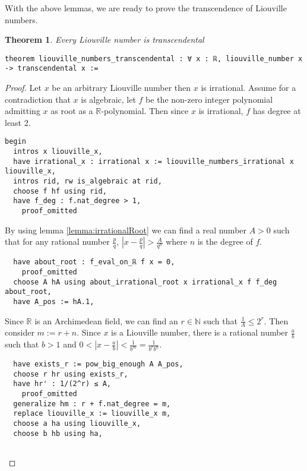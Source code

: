\documentclass{report}
\theoremstyle{definition}
\theoremstyle{plain}
\newtheorem{theorem}{Theorem}[section]
\begin{document}
With the above lemmas, we are ready to prove the transcendence of Liouville numbers.
\begin{theorem}
Every Liouville number is transcendental
\begin{verbatim}
theorem liouville_numbers_transcendental : ∀ x : ℝ, liouville_number x -> transcendental x := 
\end{verbatim}
\end{theorem}

\begin{proof}
Let $x$ be an arbitrary Liouville number then $x$ is irrational. Assume for a contradiction that $x$ is algebraic, let $f$ be the non-zero integer polynomial admitting $x$ as root as a $\mathbb R$-polynomial. Then since $x$ is irrational, $f$ has degree at least 2.

\begin{verbatim}
begin
  intros x liouville_x,
  have irrational_x : irrational x := liouville_numbers_irrational x liouville_x,
  intros rid, rw is_algebraic at rid,
  choose f hf using rid, 
  have f_deg : f.nat_degree > 1,
    proof_omitted
\end{verbatim}

By using lemma \ref{lemma:irrationalRoot} we can find a real number $A>0$ such that for any rational number $\frac pq$, $\left|x-\frac pq\right|>\frac A{q^n}$ where $n$ is the degree of $f$.
\begin{verbatim} 
  have about_root : f_eval_on_ℝ f x = 0,
    proof_omitted
  choose A hA using about_irrational_root x irrational_x f f_deg about_root,
  have A_pos := hA.1,
\end{verbatim}

Since $\mathbb R$ is an Archimedean field, we can find an $r\in\mathbb N$ such that $\frac1A\le2^r$. Then consider $m:=r+n$. Since $x$ is a Liouville number, there is a rational number $\frac a b$ such that $b>1$ and $0<\left|x-\frac a b\right|<\frac1{b^m}=\frac1{b^r b^n}$.
\begin{verbatim} 
  have exists_r := pow_big_enough A A_pos, 
  choose r hr using exists_r,
  have hr' : 1/(2^r) ≤ A,
    proof_omitted
  generalize hm : r + f.nat_degree = m,
  replace liouville_x := liouville_x m,
  choose a ha using liouville_x,
  choose b hb using ha,


\end{verbatim}
\end{proof}
\end{document}
